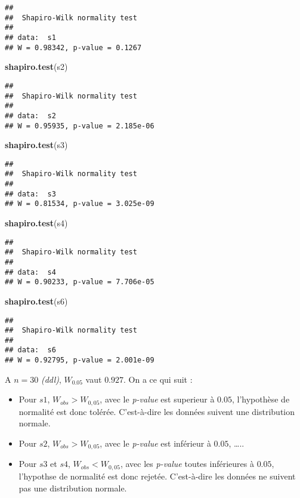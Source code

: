 \documentclass[
]{book}
\newenvironment{Shaded}{\begin{snugshade}}{\end{snugshade}}
\newcommand{\FunctionTok}[1]{\textcolor[rgb]{0.13,0.29,0.53}{\textbf{#1}}}
\newcommand{\NormalTok}[1]{#1}
\theoremstyle{definition}
\theoremstyle{definition}
\theoremstyle{definition}
\theoremstyle{definition}
\theoremstyle{remark}
\begin{document}
\begin{verbatim}
## 
##  Shapiro-Wilk normality test
## 
## data:  s1
## W = 0.98342, p-value = 0.1267
\end{verbatim}

\begin{Shaded}
\begin{Highlighting}[]
\FunctionTok{shapiro.test}\NormalTok{(s2)}
\end{Highlighting}
\end{Shaded}

\begin{verbatim}
## 
##  Shapiro-Wilk normality test
## 
## data:  s2
## W = 0.95935, p-value = 2.185e-06
\end{verbatim}

\begin{Shaded}
\begin{Highlighting}[]
\FunctionTok{shapiro.test}\NormalTok{(s3)}
\end{Highlighting}
\end{Shaded}

\begin{verbatim}
## 
##  Shapiro-Wilk normality test
## 
## data:  s3
## W = 0.81534, p-value = 3.025e-09
\end{verbatim}

\begin{Shaded}
\begin{Highlighting}[]
\FunctionTok{shapiro.test}\NormalTok{(s4)}
\end{Highlighting}
\end{Shaded}

\begin{verbatim}
## 
##  Shapiro-Wilk normality test
## 
## data:  s4
## W = 0.90233, p-value = 7.706e-05
\end{verbatim}

\begin{Shaded}
\begin{Highlighting}[]
\FunctionTok{shapiro.test}\NormalTok{(s6)}
\end{Highlighting}
\end{Shaded}

\begin{verbatim}
## 
##  Shapiro-Wilk normality test
## 
## data:  s6
## W = 0.92795, p-value = 2.001e-09
\end{verbatim}

A \(n=30\) \emph{(ddl)}, \(W_{0.05}\) vaut \(0.927\). On a ce qui suit :

\begin{itemize}
\item
  Pour \(s1\), \(W_{obs} > W_{0,05}\), avec le \emph{p-value} est superieur à \(0.05\), l'hypothèse de normalité est donc tolérée. C'est-à-dire les données suivent une distribution normale.
\item
  Pour \(s2\), \(W_{obs} > W_{0,05}\), avec le \emph{p-value} est inférieur à \(0.05\), \ldots..
\item
  Pour \(s3\) et \(s4\), \(W_{obs} < W_{0,05}\), avec les \emph{p-value} toutes inférieures à \(0.05\), l'hypothse de normalité est donc rejetée. C'est-à-dire les données ne suivent pas une distribution normale.
\end{itemize}
\end{document}

